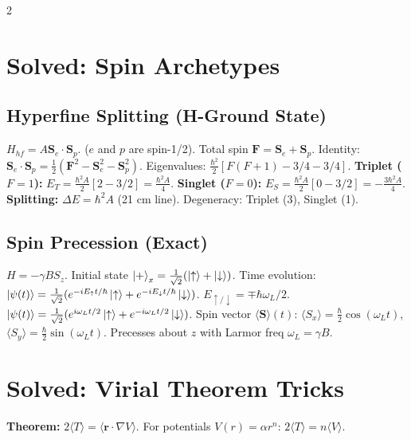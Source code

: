 \documentclass[9pt,a4paper]{article} %
\begin{document}
\begin{multicols}{2}
\section{ Solved: Spin Archetypes}

\subsection{ Hyperfine Splitting (H-Ground State)}
$H_{hf} = A \mathbf{S}_e \cdot \mathbf{S}_p$. ($e$ and $p$ are spin-1/2).
Total spin $\mathbf{F} = \mathbf{S}_e + \mathbf{S}_p$.
Identity: $\mathbf{S}_e \cdot \mathbf{S}_p = \frac{1}{2}(\mathbf{F}^2 - \mathbf{S}_e^2 - \mathbf{S}_p^2)$.
Eigenvalues: $\frac{\hbar^2}{2}[F(F+1) - 3/4 - 3/4]$.
\textbf{Triplet ($F=1$):} $E_T = \frac{\hbar^2 A}{2}[2 - 3/2] = \frac{\hbar^2 A}{4}$.
\textbf{Singlet ($F=0$):} $E_S = \frac{\hbar^2 A}{2}[0 - 3/2] = -\frac{3\hbar^2 A}{4}$.
\textbf{Splitting:} $\Delta E = \hbar^2 A$ (21 cm line).
Degeneracy: Triplet (3), Singlet (1).

\subsection{ Spin Precession (Exact)}
$H = -\gamma B S_z$. Initial state $\ket{+}_x = \frac{1}{\sqrt{2}}(\ket{\uparrow} + \ket{\downarrow})$.
Time evolution:
$\ket{\psi(t)} = \frac{1}{\sqrt{2}}(e^{-iE_\uparrow t/\hbar}\ket{\uparrow} + e^{-iE_\downarrow t/\hbar}\ket{\downarrow})$.
$E_{\uparrow/\downarrow} = \mp \hbar\omega_L/2$.
$\ket{\psi(t)} = \frac{1}{\sqrt{2}}(e^{i\omega_L t/2}\ket{\uparrow} + e^{-i\omega_L t/2}\ket{\downarrow})$.
Spin vector $\langle \mathbf{S} \rangle(t)$:
$\langle S_x \rangle = \frac{\hbar}{2} \cos(\omega_L t)$, $\langle S_y \rangle = \frac{\hbar}{2} \sin(\omega_L t)$.
Precesses about $z$ with Larmor freq $\omega_L = \gamma B$. 

\section{ Solved: Virial Theorem Tricks}

\textbf{Theorem:} $2\langle T \rangle = \langle \mathbf{r} \cdot \nabla V \rangle$.
For potentials $V(r) = \alpha r^n$: $\boxed{2\langle T \rangle = n \langle V \rangle}$.


\end{multicols}
\end{document}

